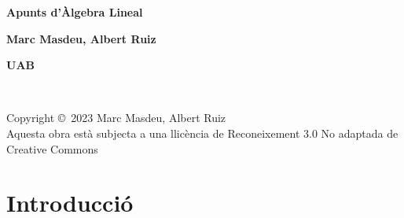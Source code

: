 \documentclass[
  11pt,
]{book}
\makeatletter
\renewcommand{\cleardoublepage}{
\clearpage\ifodd\c@page\else
\hbox{}
\vspace*{\fill}
\thispagestyle{empty}
\newpage
\fi}
\numberwithin{dummy}{section}
\theoremstyle{maincolornumbox}
\theoremstyle{blacknumex}
\theoremstyle{blacknumbox}
\theoremstyle{maincolornum}
\newlength\esp
\newif\ifusechapterimage
\makeatother
\begin{document}
	{ %

		\centering\sffamily %
		\par
		\vspace{10pt}
		\par
		{\Huge\bfseries Apunts d'Àlgebra Lineal\par} %
		\vspace{16pt} %
		{\LARGE\bfseries Marc Masdeu, Albert Ruiz\par} %
		\vspace{20pt} %
		{\LARGE\bfseries UAB\par}
	}



\newpage
~\vfill
\thispagestyle{empty}

\noindent Copyright \copyright\ 2023 Marc Masdeu, Albert Ruiz\\ %



\noindent Aquesta obra està subjecta a una llicència de Reconeixement 3.0 No adaptada de Creative Commons



\usechapterimagefalse %

\pagestyle{empty} %


\tableofcontents %

\cleardoublepage %

\pagestyle{fancy} %

\hypertarget{introducciuxf3}{%
\chapter*{Introducció}\label{introducciuxf3}}
\end{document}
